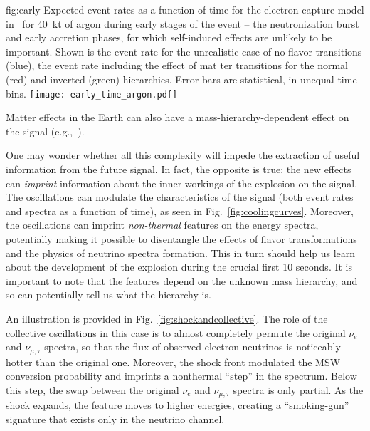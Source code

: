 \begin{dunefigure}{fig:early}
{Expected event rates as a function of time for the electron-capture model in~\cite{Huedepohl:2009wh} for \SI{40}{kt} of argon during early stages of the event -- the neutronization burst and early accretion phases, for which self-induced effects are unlikely to be important.  Shown is the event rate for the unrealistic case of no flavor transitions (blue), the event rate including the effect of mat
ter transitions for the normal (red)  and inverted (green) hierarchies.  Error bars are statistical, in unequal time bins.}
\texttt{[image: early\_time\_argon.pdf]}
\end{dunefigure}

Matter effects in the Earth can also have a mass-hierarchy-dependent effect on the signal (e.g.,~\cite{Choubey:2010up}).

One may wonder whether all this complexity will impede the extraction of useful information from the future signal. In fact, the opposite is true: the new effects can \emph{imprint} information about the inner workings of the explosion on the signal. The oscillations can modulate the characteristics of the signal (both event rates and spectra as a function of time), as seen in Fig.~\ref{fig:coolingcurves}. Moreover, the oscillations can imprint \emph{non-thermal} features on the energy spectra, potentially making it possible to disentangle the effects of flavor transformations and the physics of neutrino spectra formation. This in turn should help us learn about the development of the explosion during the crucial first 10 seconds.   It is important to note that the features depend on the unknown mass hierarchy, and so can potentially tell us what the hierarchy is.

An illustration is provided in Fig.~\ref{fig:shockandcollective}. The role of the collective oscillations in this case is to almost completely permute the original $\nu_{e}$ and $\nu_{\mu,\tau}$ spectra, so that the flux of observed electron neutrinos is noticeably hotter than the original one. Moreover, the shock front modulated the MSW conversion probability and imprints a nonthermal ``step'' in the spectrum. Below this step, the swap between the original $\nu_{e}$ and $\nu_{\mu,\tau}$ spectra is only partial. As the shock expands, the feature moves to higher energies, creating a ``smoking-gun'' signature that exists only in the neutrino channel. 




